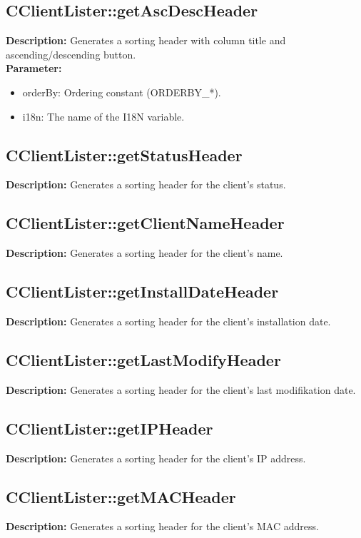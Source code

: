 \subsection{CClientLister::getAscDescHeader}
\textbf{Description:} Generates a sorting header with column title and ascending/descending button.\\
\textbf{Parameter:}
\begin{itemize}
\item orderBy: Ordering constant (ORDERBY\_*).
\item i18n: The name of the I18N variable.
\end{itemize}

\subsection{CClientLister::getStatusHeader}
\textbf{Description:} Generates a sorting header for the client's status.\\

\subsection{CClientLister::getClientNameHeader}
\textbf{Description:} Generates a sorting header for the client's name.\\

\subsection{CClientLister::getInstallDateHeader}
\textbf{Description:} Generates a sorting header for the client's installation date.\\

\subsection{CClientLister::getLastModifyHeader}
\textbf{Description:} Generates a sorting header for the client's last modifikation date.\\

\subsection{CClientLister::getIPHeader}
\textbf{Description:} Generates a sorting header for the client's IP address.\\

\subsection{CClientLister::getMACHeader}
\textbf{Description:} Generates a sorting header for the client's MAC address.\\

